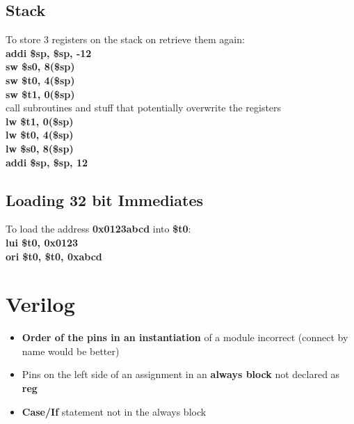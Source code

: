 \documentclass[11pt]{article}
\begin{document}
\subsection{Stack}

To store 3 registers on the stack on retrieve them again:\\

\textbf{addi \$sp, \$sp, -12} \\
\textbf{sw \$s0, 8(\$sp)} \\
\textbf{sw \$t0, 4(\$sp)} \\
\textbf{sw \$t1, 0(\$sp)} \\

call subroutines and stuff that potentially overwrite the registers\\

\textbf{lw \$t1, 0(\$sp)} \\
\textbf{lw \$t0, 4(\$sp)} \\
\textbf{lw \$s0, 8(\$sp)} \\
\textbf{addi \$sp, \$sp, 12} \\

\subsection{Loading 32 bit Immediates}

To load the address \textbf{0x0123abcd} into \textbf{\$t0}: \\
\textbf{lui  \$t0, 0x0123} \\
\textbf{ori  \$t0, \$t0, 0xabcd}

\section{Verilog}

\begin{itemize}
	\item \textbf{Order of the pins in an instantiation} of a module incorrect (connect by name would be better)
	\item Pins on the left side of an assignment in an \textbf{always block} not declared as \textbf{reg}
	\item \textbf{Case/If} statement not in the always block
\end{itemize}
	
\end{document}
